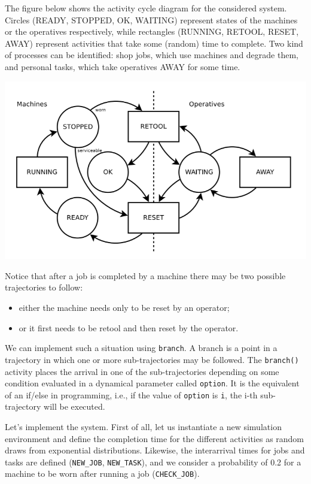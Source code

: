 \documentclass[
]{book}
\begin{document}
The figure below shows the activity cycle diagram for the considered system. Circles (READY, STOPPED, OK, WAITING) represent states of the machines or the operatives respectively, while rectangles (RUNNING, RETOOL, RESET, AWAY) represent activities that take some (random) time to complete. Two kind of processes can be identified: shop jobs, which use machines and degrade them, and personal tasks, which take operatives AWAY for some time.

\begin{center}\includegraphics[width=0.5\linewidth]{images/cycle} \end{center}

Notice that after a job is completed by a machine there may be two possible trajectories to follow:

\begin{itemize}
\item
  either the machine needs only to be reset by an operator;
\item
  or it first needs to be retool and then reset by the operator.
\end{itemize}

We can implement such a situation using \texttt{branch}. A branch is a point in a trajectory in which one or more sub-trajectories may be followed. The \texttt{branch()} activity places the arrival in one of the sub-trajectories depending on some condition evaluated in a dynamical parameter called \texttt{option}. It is the equivalent of an if/else in programming, i.e., if the value of \texttt{option} is \texttt{i}, the i-th sub-trajectory will be executed.

Let's implement the system. First of all, let us instantiate a new simulation environment and define the completion time for the different activities as random draws from exponential distributions. Likewise, the interarrival times for jobs and tasks are defined (\texttt{NEW\_JOB}, \texttt{NEW\_TASK}), and we consider a probability of 0.2 for a machine to be worn after running a job (\texttt{CHECK\_JOB}).
\end{document}
